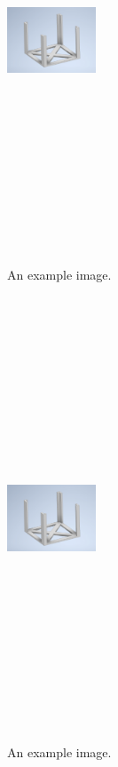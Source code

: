 \documentclass[a4paper, 12pt]{article}
\begin{document}
\begin{figure}[ht]
    \centering
    \includegraphics[width=100px,height=500px]{img/instalace_rozvadec_konstrukce_01.png}
    \caption{An example image.}
\end{figure}

\begin{figure}[ht]
    \centering
    \includegraphics[width=100px,height=500px, keepaspectratio]{img/instalace_rozvadec_konstrukce_01.png}
    \caption{An example image.}
\end{figure}
\end{document}

